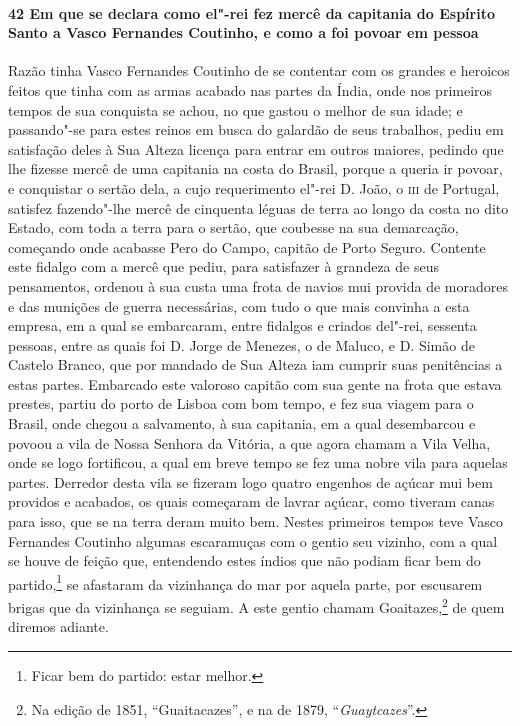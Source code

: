 \begin{linenumbers}
\paragraph{42 Em que se declara como el"-rei fez mercê da capitania do Espírito Santo a
Vasco Fernandes Coutinho, e como a foi povoar em pessoa} \quad
Razão tinha Vasco Fernandes Coutinho de se contentar com os grandes e heroicos feitos que
tinha com as armas acabado nas partes da Índia, onde nos primeiros tempos de sua conquista
se achou, no que gastou o melhor de sua idade; e passando"-se para estes reinos em busca do
galardão de seus trabalhos, pediu em satisfação deles à Sua Alteza licença para entrar em
outros maiores, pedindo que lhe fizesse mercê de uma capitania na costa do Brasil, porque
a queria ir povoar, e conquistar o sertão dela, a cujo requerimento el"-rei D. João, o
\textsc{iii} de Portugal, satisfez fazendo"-lhe mercê de cinquenta léguas de terra ao longo
da costa no dito Estado, com toda a terra para o sertão, que coubesse na sua demarcação,
começando onde acabasse Pero do Campo, capitão de Porto Seguro. Contente este fidalgo com
a mercê que pediu, para satisfazer à grandeza de seus pensamentos, ordenou à sua custa uma
frota de navios mui provida de moradores e das munições de guerra necessárias, com tudo o
que mais convinha a esta empresa, em a qual se embarcaram, entre fidalgos e criados
del"-rei, sessenta pessoas, entre as quais foi D. Jorge de Menezes, o de Maluco, e D. Simão
de Castelo Branco, que por mandado de Sua Alteza iam cumprir suas penitências a estas
partes. Embarcado este valoroso capitão com sua gente na frota que estava prestes, partiu
do porto de Lisboa com bom tempo, e fez sua viagem para o Brasil, onde chegou a
salvamento, à sua capitania, em a qual desembarcou e povoou a vila de Nossa Senhora da
Vitória, a que agora chamam a Vila Velha, onde se logo fortificou, a qual em breve tempo
se fez uma nobre vila para aquelas partes. Derredor desta vila se fizeram logo quatro
engenhos de açúcar mui bem providos e acabados, os quais começaram de lavrar açúcar, como
tiveram canas para isso, que se na terra deram muito bem. Nestes primeiros tempos teve
Vasco Fernandes Coutinho algumas escaramuças com o gentio seu vizinho, com a qual se houve
de feição que, entendendo estes índios que não podiam ficar bem do partido,\footnote{ Ficar
bem do partido: estar melhor.} se afastaram da vizinhança do mar por aquela parte, por
escusarem brigas que da vizinhança se seguiam. A este gentio chamam Goaitazes,\footnote{ Na
edição de 1851, ``Guaitacazes'', e na de 1879, ``\textit{Guaytcazes}''.} de quem diremos
adiante.


\end{linenumbers}
